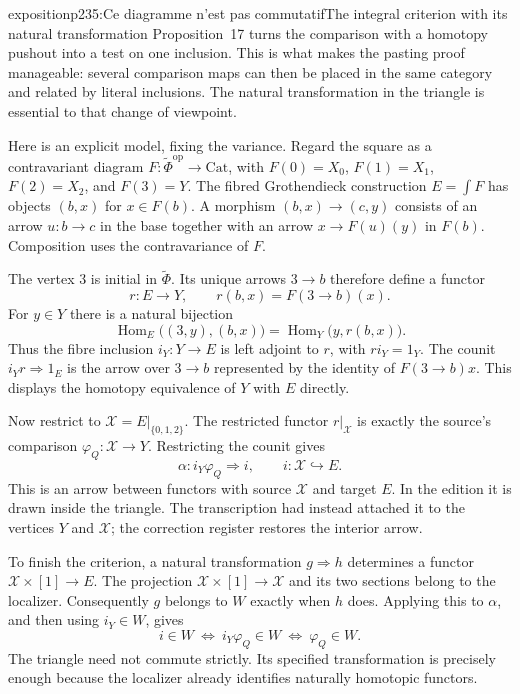 \begin{dcomment}{exposition}{p235:Ce diagramme n'est pas commutatif}{The integral criterion with its natural transformation}
Proposition~17 turns the comparison with a homotopy pushout into a test on one inclusion. This is what makes the pasting proof manageable: several comparison maps can then be placed in the same category and related by literal inclusions. The natural transformation in the triangle is essential to that change of viewpoint.

Here is an explicit model, fixing the variance. Regard the square as a contravariant diagram $F:\widetilde\Phi^{\mathrm{op}}\to\mathrm{Cat}$, with $F(0)=X_0$, $F(1)=X_1$, $F(2)=X_2$, and $F(3)=Y$. The fibred Grothendieck construction $E=\int F$ has objects $(b,x)$ for $x\in F(b)$. A morphism $(b,x)\to(c,y)$ consists of an arrow $u:b\to c$ in the base together with an arrow $x\to F(u)(y)$ in $F(b)$. Composition uses the contravariance of $F$.

The vertex $3$ is initial in $\widetilde\Phi$. Its unique arrows $3\to b$ therefore define a functor
\[
 r:E\longrightarrow Y,
 \qquad r(b,x)=F(3\to b)(x).
\]
For $y\in Y$ there is a natural bijection
\[
 \operatorname{Hom}_E\bigl((3,y),(b,x)\bigr)
   =\operatorname{Hom}_Y\bigl(y,r(b,x)\bigr).
\]
Thus the fibre inclusion $i_Y:Y\to E$ is left adjoint to $r$, with $ri_Y=1_Y$. The counit $i_Yr\Rightarrow1_E$ is the arrow over $3\to b$ represented by the identity of $F(3\to b)x$. This displays the homotopy equivalence of $Y$ with $E$ directly.

Now restrict to $\mathcal X=E|_{\{0,1,2\}}$. The restricted functor $r|_{\mathcal X}$ is exactly the source's comparison $\varphi_Q:\mathcal X\to Y$. Restricting the counit gives
\[
 \alpha:i_Y\varphi_Q\Longrightarrow i,
 \qquad i:\mathcal X\hookrightarrow E.
\]
This is an arrow between functors with source $\mathcal X$ and target $E$. In the edition it is drawn inside the triangle. The transcription had instead attached it to the vertices $Y$ and $\mathcal X$; the correction register restores the interior arrow.

To finish the criterion, a natural transformation $g\Rightarrow h$ determines a functor $\mathcal X\times[1]\to E$. The projection $\mathcal X\times[1]\to\mathcal X$ and its two sections belong to the localizer. Consequently $g$ belongs to $W$ exactly when $h$ does. Applying this to $\alpha$, and then using $i_Y\in W$, gives
\[
 i\in W
 \ \Longleftrightarrow\ i_Y\varphi_Q\in W
 \ \Longleftrightarrow\ \varphi_Q\in W.
\]
The triangle need not commute strictly. Its specified transformation is precisely enough because the localizer already identifies naturally homotopic functors.
\end{dcomment}

